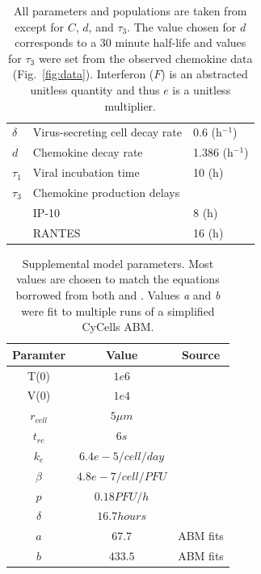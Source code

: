 \documentclass[10pt]{article}
\begin{document}
\begin{table}
\begin{center}
\begin{tabular}{|  l  l  l  |}
  $\delta$ & Virus-secreting cell decay rate & 0.6 (h$^{-1}$) \\
  $d$ & Chemokine decay rate & 1.386 (h$^{-1}$) \\
  $\tau_1$ & Viral incubation time & 10 (h) \\
  $\tau_3$ & Chemokine production delays & \\
    & \hspace{2em} IP-10 & 8 (h)\\
    & \hspace{2em} RANTES & 16 (h)\\
  \hline
\end{tabular}
\caption{All parameters and populations are taken from \cite{Mitchell2011} except for $C$, $d$, and $\tau_3$.  The value chosen for $d$ corresponds to a 30 minute half-life and values for $\tau_3$ were set from the observed chemokine data (Fig.~\ref{fig:data}).  Interferon ($F$) is an abstracted unitless quantity and thus $e$ is a unitless multiplier.}
\label{tab:dde}
\end{center}
\end{table}


\begin{table}[!ht]
\begin{center}
\begin{tabular}{ | c | c | c | }
  \hline                        
  Paramter & Value & Source \\
  \hline
  T(0) & $1e6$ & \cite{Mitchell2011} \\
  V(0) &  $1e4$ & \cite{Mitchell2011} \\
  $r_{cell}$ &  $5 \mu m$ & \cite{Miao2010} \\
  $t_{rc}$ & $6s$ & \cite{Peters1983} \\
  $k_e$ & $6.4e-5/cell/day$ & \cite{Miao2010} \\
  $\beta$ & $4.8e-7/cell/PFU$ & \cite{Mitchell2011} \\
  $p$ & $0.18 PFU/h$ & \cite{Mitchell2011} \\
  $\delta$ & $16.7 hours$ & \cite{Mitchell2011} \\
  $a$ & $67.7$ & ABM fits \\
  $b$ & $433.5$ & ABM fits \\
  \hline  
\end{tabular}
\caption{Supplemental model parameters.  Most values are chosen to match the equations borrowed from both \cite{Mitchell2011} and \cite{Miao2010}.  Values \textit{a} and \textit{b} were fit to multiple runs of a simplified CyCells ABM.}
\label{table:supplement}
\end{center}
\end{table}
\end{document}
